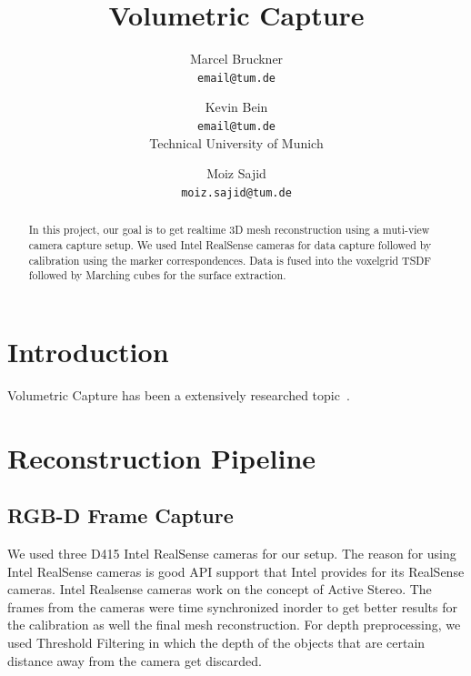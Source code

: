 \documentclass[10pt,twocolumn,letterpaper]{article}
\begin{document}
\title{Volumetric Capture}

\author{Marcel Bruckner\\
{\tt\small email@tum.de}
\and
Kevin Bein\\
{\tt\small email@tum.de}\\
Technical University of Munich
\and
Moiz Sajid\\
{\tt\small moiz.sajid@tum.de}
}

\maketitle

\begin{abstract}
   In this project, our goal is to get realtime 3D mesh reconstruction using a muti-view camera capture setup. We used Intel RealSense cameras for data capture followed by calibration using the marker correspondences. Data is fused into the voxelgrid TSDF followed by Marching cubes for the surface extraction.  
\end{abstract}

\section{Introduction}

Volumetric Capture has been a extensively researched topic~\cite{Authors4}.

\section{Reconstruction Pipeline}

\subsection{RGB-D Frame Capture}
We used three D415 Intel RealSense cameras for our setup. The reason for using Intel RealSense cameras is good API support that Intel provides for its RealSense cameras. Intel Realsense cameras work on the concept of Active Stereo. The frames from the cameras were time synchronized inorder to get better results for the calibration as well the final mesh reconstruction. For depth preprocessing, we used Threshold Filtering in which the depth of the objects that are certain distance away from the camera get discarded. 
\end{document}
